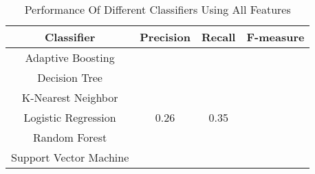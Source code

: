 \documentclass[11pt]{article}
\begin{document}
\begin{table}
\centering
\caption{Performance Of Different Classifiers Using All Features} \label{table1}
\vspace{0.3cm}
\begin{tabular}{|c|c|c|c|}
\hline  Classifier  & Precision  &Recall &F-measure\\
\hline   Adaptive Boosting &    &     & \\
\hline   Decision Tree     &    &   & \\
\hline   K-Nearest Neighbor     &    &   & \\
\hline   Logistic Regression &0.26 &0.35 & \\
\hline   Random Forest      &   &   & \\
\hline   Support Vector Machine &    &     & \\
\hline
\end{tabular}
\end{table}
\end{document}
